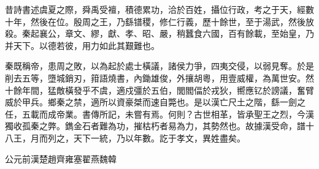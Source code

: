 
\begin{pinyinscope}
昔詩書述虞夏之際，舜禹受襢，積德累功，洽於百姓，攝位行政，考之于天，經數十年，然後在位。殷周之王，乃繇镨稷，修仁行義，歷十餘世，至于湯武，然後放殺。秦起襄公，章文、繆，獻、孝、昭、嚴，稍蠶食六國，百有餘載，至始皇，乃并天下。以德若彼，用力如此其艱難也。

秦既稱帝，患周之敗，以為起於處士橫議，諸侯力爭，四夷交侵，以弱見奪。於是削去五等，墮城銷刃，箝語燒書，內鋤雄俊，外攘胡粵，用壹威權，為萬世安。然十餘年間，猛敵橫發乎不虞，適戍彊於五伯，閭閻偪於戎狄，嚮應钇於謗議，奮臂威於甲兵。鄉秦之禁，適所以資豪桀而速自斃也。是以漢亡尺土之階，繇一劍之任，五載而成帝業。書傳所記，未嘗有焉。何則？古世相革，皆承聖王之烈，今漢獨收孤秦之弊。鐫金石者難為功，摧枯朽者易為力，其勢然也。故據漢受命，譜十八王，月而列之，天下一統，乃以年數。訖于孝文，異姓盡矣。

公元前漢楚趙齊雍塞翟燕魏韓


\end{pinyinscope}